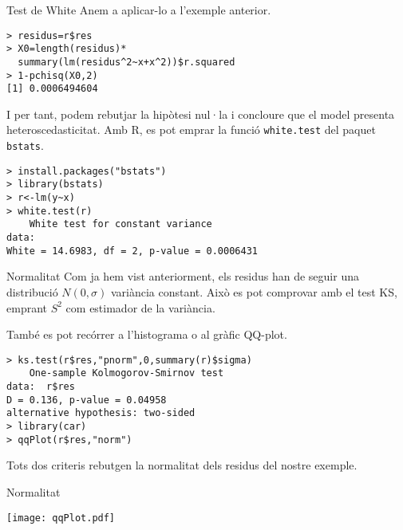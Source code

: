 \documentclass[12pt,t]{beamer}
\theoremstyle{plain}
\theoremstyle{definition}
\begin{document}
\begin{frame}[fragile]{Test de White}
Anem a aplicar-lo a l'exemple anterior.

\begin{verbatim}
> residus=r$res
> X0=length(residus)*
  summary(lm(residus^2~x+x^2))$r.squared
> 1-pchisq(X0,2)
[1] 0.0006494604
\end{verbatim}

I per tant, podem rebutjar la hipòtesi nul·la i concloure que el model presenta heteroscedasticitat. Amb R, es pot emprar la funció \texttt{white.test} del paquet \texttt{bstats}.
\begin{footnotesize}
\begin{verbatim}
> install.packages("bstats")
> library(bstats)
> r<-lm(y~x)
> white.test(r)
	White test for constant variance
data:  
White = 14.6983, df = 2, p-value = 0.0006431
\end{verbatim}
\end{footnotesize}

\end{frame}

\begin{frame}[fragile]{Normalitat}
Com ja hem vist anteriorment, els residus han de seguir una distribució $N(0,\sigma)$ variància constant. Això es pot comprovar amb el test KS, emprant $S^2$ com estimador de la variància. 

\vspace{0.25cm}

També es pot recórrer a l'histograma o al gràfic QQ-plot.

\begin{verbatim}
> ks.test(r$res,"pnorm",0,summary(r)$sigma)
	One-sample Kolmogorov-Smirnov test
data:  r$res
D = 0.136, p-value = 0.04958
alternative hypothesis: two-sided
> library(car)
> qqPlot(r$res,"norm")
\end{verbatim}

Tots dos criteris rebutgen la normalitat dels residus del nostre exemple.
\end{frame}



\begin{frame}[fragile]{Normalitat}

\begin{center}
\texttt{[image: qqPlot.pdf]}
\end{center}


\end{frame}
\end{document}
